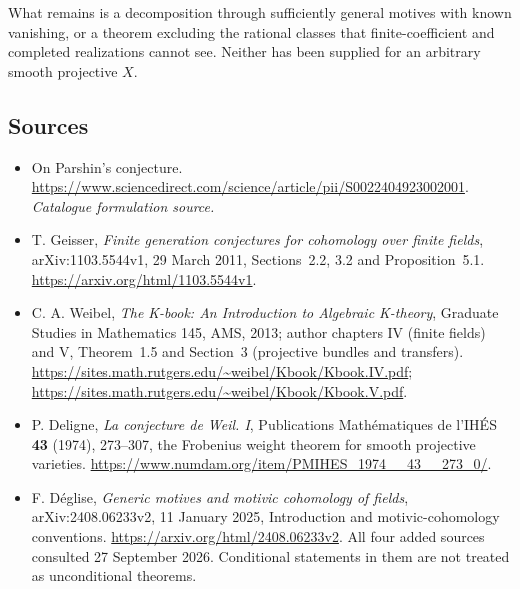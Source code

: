 \documentclass[11pt,a4paper]{article}
\numberwithin{equation}{section}
\begin{document}
What remains is a decomposition through sufficiently general motives
with known vanishing, or a theorem excluding the rational classes that
finite-coefficient and completed realizations cannot see. Neither has
been supplied for an arbitrary smooth projective $X$.
\subsection{Sources}
\begin{itemize}\raggedright
\item[\textnormal{[S1]}]\hypertarget{source:statement:1}{} On Parshin's conjecture.
\url{https://www.sciencedirect.com/science/article/pii/S0022404923002001}.
{\small\textit{Catalogue formulation source.}}
\item[\textnormal{[E1]}]\hypertarget{extra:statement:1}{}
T. Geisser, \emph{Finite generation conjectures for cohomology over finite
fields}, arXiv:1103.5544v1, 29 March 2011, Sections~2.2, 3.2 and
Proposition~5.1. \url{https://arxiv.org/html/1103.5544v1}.
\item[\textnormal{[E2]}]\hypertarget{extra:statement:2}{}
C. A. Weibel, \emph{The K-book: An Introduction to Algebraic K-theory},
Graduate Studies in Mathematics 145, AMS, 2013; author chapters IV
(finite fields) and V, Theorem~1.5 and Section~3 (projective bundles and
transfers). \url{https://sites.math.rutgers.edu/~weibel/Kbook/Kbook.IV.pdf};
\url{https://sites.math.rutgers.edu/~weibel/Kbook/Kbook.V.pdf}.
\item[\textnormal{[E3]}]\hypertarget{extra:statement:3}{}
P. Deligne, \emph{La conjecture de Weil. I}, Publications Math\'ematiques
de l'IH\'ES \textbf{43} (1974), 273--307, the Frobenius weight theorem
for smooth projective varieties.
\url{https://www.numdam.org/item/PMIHES_1974__43__273_0/}.
\item[\textnormal{[E4]}]\hypertarget{extra:statement:4}{}
F. D\'eglise, \emph{Generic motives and motivic cohomology of fields},
arXiv:2408.06233v2, 11 January 2025, Introduction and motivic-cohomology
conventions. \url{https://arxiv.org/html/2408.06233v2}.
All four added sources consulted 27 September 2026. Conditional statements
in them are not treated as unconditional theorems.
\end{itemize}
\end{document}
